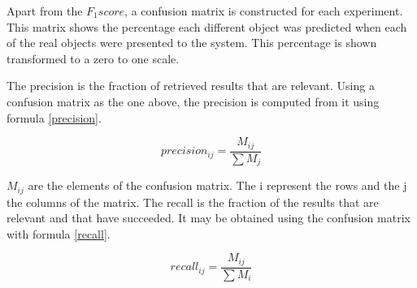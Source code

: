 		Apart from the $F_1 score$, a confusion matrix is constructed for each experiment. 
		This matrix shows the percentage each different object was predicted when each of the real objects were presented to the system. 
		This percentage is shown transformed to a zero to one scale. 






		The precision is the fraction of retrieved results that are relevant.  
		Using a confusion matrix as the one above, the precision is computed from it using formula \ref{precision}.
		\begin{center}
		\begin{equation}
		\label{precision}
		precision_{ij}=\frac{M_{ij}}{\sum M_j}
		\end{equation}
		\end{center}

		$M_{ij}$ are the elements of the confusion matrix. 
		The i represent the rows and the j the columns of the matrix. 
		The recall is the fraction of the results that are relevant and that have succeeded. 
		It may be obtained using the confusion matrix with formula \ref{recall}.
		\begin{center}
		\begin{equation}
		\label{recall}
		recall_{ij}=\frac{M_{ij}}{\sum M_i}
		\end{equation}
		\end{center}

